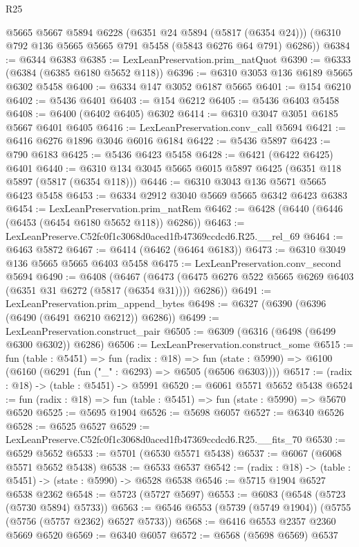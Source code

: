 \begin{lexlean}{R25}
\begin{coremodule}
      @5665
      @5667
      @5894
      @6228
      (@6351 @24 @5894 (@5817 (@6354 @24)))
      (@6310 @792 @136 @5665 @5665 @791 @5458 (@5843 @6276 @64 @791) @6286))
@6384 := @6344 @6383
@6385 := LexLeanPreservation.prim_natQuot
@6390 := @6333 (@6384 (@6385 @6180 @5652 @118))
@6396 := @6310 @3053 @136 @6189 @5665 @6302 @5458
@6400 := @6334 @147 @3052 @6187 @5665
@6401 := @154 @6210
@6402 := @5436 @6401
@6403 := @154 @6212
@6405 := @5436 @6403 @5458
@6408 := @6400 (@6402 @6405) @6302
@6414 := @6310 @3047 @3051 @6185 @5667 @6401 @6405
@6416 := LexLeanPreservation.conv_call @5694
@6421 := @6416 @6276 @1896 @3046 @6016 @6184
@6422 := @5436 @5897
@6423 := @790 @6183
@6425 := @5436 @6423 @5458
@6428 := @6421 (@6422 @6425) @6401
@6440 := @6310 @134 @3045 @5665 @6015 @5897 @6425 (@6351 @118 @5897 (@5817 (@6354 @118)))
@6446 := @6310 @3043 @136 @5671 @5665 @6423 @5458
@6453 := @6334 @2912 @3040 @5669 @5665 @6342 @6423 @6383
@6454 := LexLeanPreservation.prim_natRem
@6462 := @6428 (@6440 (@6446 (@6453 (@6454 @6180 @5652 @118)) @6286))
@6463 := LexLeanPreserve.C52fc0f1c3068d0aced1fb47369ccdcd6.R25.__rel_69
@6464 := @6463 @5872
@6467 := @6414 (@6462 (@6464 @6183))
@6473 := @6310 @3049 @136 @5665 @5665 @6403 @5458
@6475 := LexLeanPreservation.conv_second @5694
@6490 := @6408
    (@6467 (@6473 (@6475 @6276 @522 @5665 @6269 @6403 (@6351 @31 @6272 (@5817 (@6354 @31)))) @6286))
@6491 := LexLeanPreservation.prim_append_bytes
@6498 := @6327 (@6390 (@6396 (@6490 (@6491 @6210 @6212)) @6286))
@6499 := LexLeanPreservation.construct_pair
@6505 := @6309 (@6316 (@6498 (@6499 @6300 @6302)) @6286)
@6506 := LexLeanPreservation.construct_some
@6515 := fun (table : @5451) =>
  fun (radix : @18) =>
  fun (state : @5990) => @6100 (@6160 (@6291 (fun ("_" : @6293) => @6505 (@6506 @6303))))
@6517 := (radix : @18) -> (table : @5451) -> @5991
@6520 := @6061 @5571 @5652 @5438
@6524 := fun (radix : @18) => fun (table : @5451) => fun (state : @5990) => @5670 @6520
@6525 := @5695 @1904
@6526 := @5698 @6057
@6527 := @6340 @6526
@6528 := @6525 @6527
@6529 := LexLeanPreserve.C52fc0f1c3068d0aced1fb47369ccdcd6.R25.__fits_70
@6530 := @6529 @5652
@6533 := @5701 (@6530 @5571 @5438)
@6537 := @6067 (@6068 @5571 @5652 @5438)
@6538 := @6533 @6537
@6542 := (radix : @18) -> (table : @5451) -> (state : @5990) -> @6528 @6538
@6546 := @5715 @1904 @6527 @6538 @2362
@6548 := @5723 (@5727 @5697)
@6553 := @6083 (@6548 (@5723 (@5730 @5894) @5733))
@6563 := @6546 @6553 (@5739 (@5749 @1904)) (@5755 (@5756 (@5757 @2362) @6527 @5733))
@6568 := @6416 @6553 @2357 @2360 @5669 @6520
@6569 := @6340 @6057
@6572 := @6568 (@5698 @6569) @6537

\end{coremodule}
\end{lexlean}
